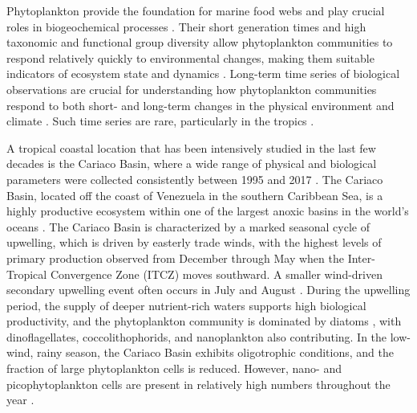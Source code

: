 \documentclass[draft]{agujournal2019}
\begin{document}

Phytoplankton provide the foundation for marine food webs and play crucial roles in biogeochemical processes \cite{falkowski_biogeochemical_1998}. Their short generation times and high taxonomic and functional group diversity allow phytoplankton communities to respond relatively quickly to environmental changes, making them suitable indicators of ecosystem state and dynamics \cite{alvarez-cobelas_what_1998, barton_anthropogenic_2016, di_cavalho_temporal_2023}. Long-term time series of biological observations are crucial for understanding how phytoplankton communities respond to both short- and long-term changes in the physical environment and climate \cite{carstensen_need_2014, henson_observing_2016}. Such time series are rare, particularly in the tropics \cite{clarke_does_2017}. 

A tropical coastal location that has been intensively studied in the last few decades is the Cariaco Basin, where a wide range of physical and biological parameters were collected consistently between 1995 and 2017 \cite{muller-karger_scientific_2019}. The Cariaco Basin, located off the coast of Venezuela in the southern Caribbean Sea, is a highly productive ecosystem within one of the largest anoxic basins in the world's oceans \cite{edgcomb_accessing_2011}. The Cariaco Basin is characterized by a marked seasonal cycle of upwelling, which is driven by easterly trade winds, with the highest levels of primary production observed from December through May when the Inter-Tropical Convergence Zone (ITCZ) moves southward. A smaller wind-driven secondary upwelling event often occurs in July and August \cite{mullerkarger_annual_2001, astor_seasonal_2003}. During the upwelling period, the supply of deeper nutrient-rich waters supports high biological productivity, and the phytoplankton community is dominated by diatoms \cite{romero_seasonal_2009}, with dinoflagellates, coccolithophorids, and nanoplankton also contributing. In the low-wind, rainy season, the Cariaco Basin exhibits oligotrophic conditions, and the fraction of large phytoplankton cells is reduced. However, nano- and picophytoplankton cells are present in relatively high numbers throughout the year \cite{lorenzoni_characterization_2015}.    
\end{document}
